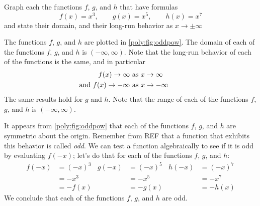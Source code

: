 \begin{pccexample}
	\label{poly:ex:oddpow}
	Graph each the functions $f$, $g$, and $h$ that have 
	formulas
	\[
		f(x)=x^3,   \qquad  g(x)=x^5, \qquad h(x)=x^7
	\]
	and state their domain, and their long-run behavior as $x\rightarrow\pm\infty$
	\begin{pccsolution}
		The functions $f$, $g$, and $h$ are plotted in \cref{poly:fig:oddpow}.
		The domain of each of the functions $f$, $g$, and $h$ is $(-\infty,\infty)$. Note that 
		the long-run behavior of each of the functions is the same, and in particular
		\begin{align*}
			f(x)\rightarrow\infty                           & \text{ as } x\rightarrow\infty  \\ 
			\mathllap{\text{and }}   f(x)\rightarrow-\infty & \text{ as } x\rightarrow-\infty 
		\end{align*}
		The same results hold for $g$ and $h$. Note that the range of each of the 
		functions $f$, $g$, and $h$ is $(-\infty,\infty)$.
		
		It appears from \cref{poly:fig:oddpow} that each of the functions $f$, $g$, 
		and $h$ are symmetric about the origin. Remember from REF 
		that a function that exhibits this behavior is called \emph{odd}. We can 
		test a function algebraically to see if it is odd by evaluating $f(-x)$; let's
		do that for each of the functions $f$, $g$, and $h$:
		\begin{align*}
			f(-x) & =(-x)^3 & g(-x) & =(-x)^5 & h(-x) & =(-x)^7 \\ 
			      & =-x^3   &       & =-x^5   &       & =-x^7   \\   
			      & =-f(x)  &       & =-g(x)  &       & =-h(x)  
		\end{align*}
		We conclude that each of the functions $f$, $g$, and $h$ are odd.
	\end{pccsolution}
\end{pccexample}

